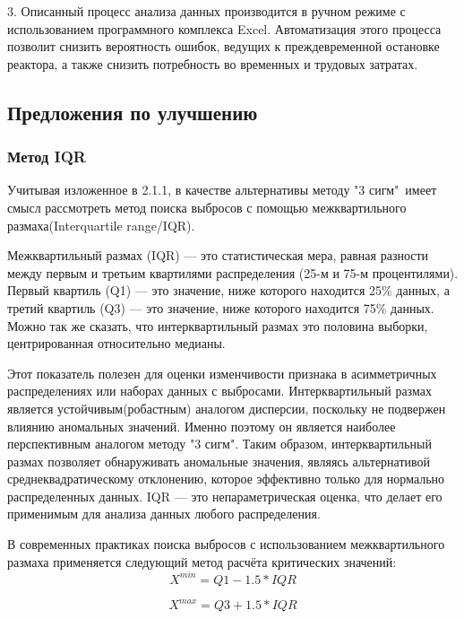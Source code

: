 3. Описанный процесс анализа данных производится в ручном режиме с использованием программного комплекса Excel. Автоматизация этого процесса позволит снизить вероятность ошибок, ведущих к преждевременной остановке реактора, а также снизить потребность во временных и трудовых затратах.

\subsection{Предложения по улучшению}

\subsubsection{Метод IQR}

Учитывая изложенное в 2.1.1, в качестве альтернативы методу "3 сигм"\ имеет смысл рассмотреть метод поиска выбросов с помощью межквартильного размаха(Interquartile range/IQR).

Межквартильный размах (IQR) — это статистическая мера, равная разности между первым и третьим квартилями распределения (25-м и 75-м процентилями). Первый квартиль (Q1) — это значение, ниже которого находится 25\% данных, а третий квартиль (Q3) — это значение, ниже которого находится 75\% данных. Можно так же сказать, что интерквартильный размах это половина выборки, центрированная относительно медианы. 

Этот показатель полезен для оценки изменчивости признака в асимметричных распределениях или наборах данных с выбросами. Интерквартильный размах является устойчивым(робастным) аналогом дисперсии, поскольку не подвержен влиянию аномальных значений. Именно поэтому он является наиболее перспективным аналогом методу "3 сигм". 
Таким образом, интерквартильный размах позволяет обнаруживать аномальные значения, являясь альтернативой среднеквадратическому отклонению, которое эффективно только для нормально распределенных данных. IQR — это непараметрическая оценка, что делает его применимым для анализа данных любого распределения.

В современных практиках поиска выбросов с использованием межквартильного размаха применяется следующий метод расчёта критических значений:
\begin{equation} \label{eq:IQRmin}
	X^{min}  = Q1-1.5*IQR
\end{equation}

\begin{equation} \label{eq:IQRmax}
	X^{max}  = Q3+1.5*IQR
\end{equation}


